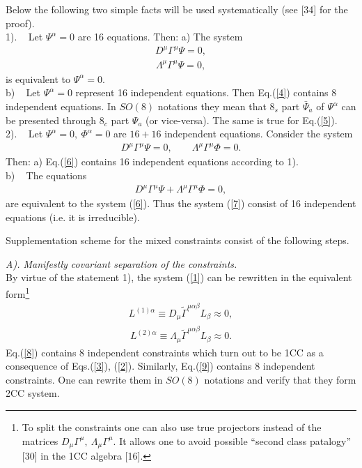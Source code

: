 \documentclass[a4paper]{article}
\begin{document}
Below the following two simple facts will be used 
systematically (see [34] for the proof). \\
1). ~ Let $\Psi^\alpha=0$ are 16 equations. Then: a) The system 
\begin{eqnarray}\label{4}
D^\mu\Gamma^\mu\Psi=0,
\end{eqnarray}
\begin{eqnarray}\label{5}
\Lambda^\mu\Gamma^\mu\Psi=0,
\end{eqnarray}
is equivalent to $\Psi^\alpha=0$. \\
b) ~ Let $\Psi^\alpha=0$ represent 16 independent equations. Then 
Eq.(\ref{4}) contains 8 independent equations. In $SO(8)$ notations 
they mean that $8_s$ part $\bar\Psi_{\dot a}$ of $\Psi^\alpha$ can be 
presented through $8_c$ part $\Psi_a$ (or vice-versa). The same is 
true for Eq.(\ref{5}). \\
2). ~ Let $\Psi^\alpha=0, ~ \Phi^\alpha=0$ are $16+16$ independent 
equations. Consider the system 
\begin{eqnarray}\label{6}
D^\mu\Gamma^\mu\Psi=0, \qquad
\Lambda^\mu\Gamma^\mu\Phi=0.
\end{eqnarray}
Then: a) Eq.(\ref{6}) contains 16 independent equations according 
to 1). \\
b) ~ The equations 
\begin{eqnarray}\label{7}
D^\mu\Gamma^\mu\Psi+\Lambda^\mu\Gamma^\mu\Phi=0,
\end{eqnarray}
are equivalent to the system (\ref{6}). Thus the system (\ref{7}) 
consist of 16 independent equations (i.e. it is irreducible). 

Supplementation scheme
for the mixed constraints consist of the following steps.

{\em A). Manifestly covariant separation of the constraints.} \\
By virtue of the statement 1), the system (\ref{1}) can be rewritten 
in the equivalent form\footnote{To split the constraints one can
also use true projectors instead of the matrices $D_\mu\Gamma^\mu, ~
\Lambda_\mu\Gamma^\mu$. It allows one to avoid possible
``second class patalogy'' [30] in the 1CC algebra [16].}
\begin{eqnarray}\label{8}
L^{(1)\alpha}\equiv D_\mu\tilde\Gamma^{\mu\alpha\beta}L_\beta
\approx 0,
\end{eqnarray}
\begin{eqnarray}\label{9}
L^{(2)\alpha}\equiv \Lambda_\mu\tilde\Gamma^{\mu\alpha\beta}L_\beta
\approx 0.
\end{eqnarray}
Eq.(\ref{8}) contains 8 independent constraints  
which turn out to be 1CC as a consequence of Eqs.(\ref{3}), 
(\ref{2}). Similarly, Eq.(\ref{9}) contains 8 independent constraints.
One can rewrite them in $SO(8)$ notations and verify that they form 
2CC system. 
\end{document}
